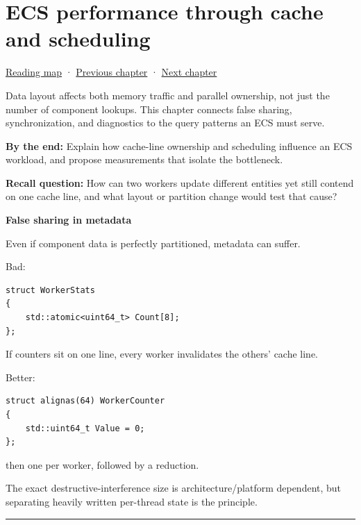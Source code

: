 \chapter{ECS performance through cache and scheduling}\label{05-engine-i-ch017-ecs-performance-through-cache-and-scheduling}\hypertarget{05-engine-i-ch017}{}\label{stagechapter:05-engine-i-ch017}

\hypertarget{05-engine-i-ch017-ecs-performance-through-cache-and-scheduling}{}

\hyperref[volume-reading-map]{Reading map} · \hyperref[05-engine-i-ch016-archetypes-chunks-relationships-and-transforms]{Previous chapter} · \hyperref[05-engine-i-ch018-ecs-contracts-diagnostics-and-gpu-handoff]{Next chapter}

Data layout affects both memory traffic and parallel ownership, not just the number of component lookups. This chapter connects false sharing, synchronization, and diagnostics to the query patterns an ECS must serve.

\textbf{By the end:} Explain how cache-line ownership and scheduling influence an ECS workload, and propose measurements that isolate the bottleneck.

\textbf{Recall question:} How can two workers update different entities yet still contend on one cache line, and what layout or partition change would test that cause?

\textbf{False sharing in metadata}

Even if component data is perfectly partitioned, metadata can suffer.

Bad:

\begin{verbatim}
struct WorkerStats
{
    std::atomic<uint64_t> Count[8];
};
\end{verbatim}

If counters sit on one line, every worker invalidates the others' cache line.

Better:

\begin{verbatim}
struct alignas(64) WorkerCounter
{
    std::uint64_t Value = 0;
};
\end{verbatim}

then one per worker, followed by a reduction.

The exact destructive-interference size is architecture/platform dependent, but separating heavily written per-thread state is the principle.

\begin{center}\rule{0.5\linewidth}{0.5pt}\end{center}

